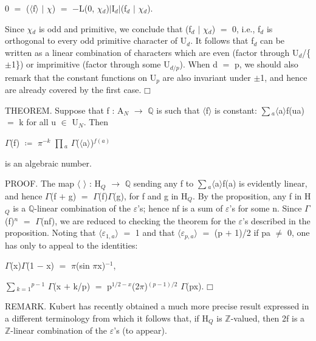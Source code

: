 \documentclass[10pt,twoside]{article}
\begin{document}
0 \ensuremath{=} (\ensuremath{⟨}f\ensuremath{⟩} \ensuremath{|} \ensuremath{χ}) \ensuremath{=} \ensuremath{−}L(0, \ensuremath{χ}\ensuremath{_{d}})\ensuremath{|}I\ensuremath{_{d}}\ensuremath{|}(f\ensuremath{_{d}} \ensuremath{|} \ensuremath{χ}\ensuremath{_{d}}).\par
Since \ensuremath{χ}\ensuremath{_{d}} is odd and primitive, we conclude that (f\ensuremath{_{d}} \ensuremath{|} \ensuremath{χ}\ensuremath{_{d}}) \ensuremath{=} 0, i.e., f\ensuremath{_{d}} is orthogonal to every odd primitive character of U\ensuremath{_{d}}. It follows that f\ensuremath{_{d}} can be written as a linear combination of characters which are even (factor through U\ensuremath{_{d}}/\{\ensuremath{±}1\}) or imprimitive (factor through some U\ensuremath{_{d/p}}). When d \ensuremath{=} p, we should also remark that the constant functions on U\ensuremath{_{p}} are also invariant under \ensuremath{±}1, and hence are already covered by the first case. \ensuremath{□}\par
THEOREM. Suppose that f : A\ensuremath{_{N}} \ensuremath{→} \ensuremath{ℚ} is such that \ensuremath{⟨}f\ensuremath{⟩} is constant: \ensuremath{∑}\ensuremath{_{a}}\ensuremath{⟨}a\ensuremath{⟩}f(ua) \ensuremath{=} k for all u \ensuremath{∈} U\ensuremath{_{N}}. Then\par
\ensuremath{Γ}(f) \ensuremath{≔} \ensuremath{π}\ensuremath{^{-k}} \ensuremath{∏}\ensuremath{_{a}} \ensuremath{Γ}(\ensuremath{⟨}a\ensuremath{⟩})\ensuremath{^{f(a)}}\par
is an algebraic number.\par
PROOF. The map \ensuremath{⟨} \ensuremath{⟩} : H\ensuremath{_{Q}} \ensuremath{→} \ensuremath{ℚ} sending any f to \ensuremath{∑}\ensuremath{_{a}}\ensuremath{⟨}a\ensuremath{⟩}f(a) is evidently linear, and hence \ensuremath{Γ}(f \ensuremath{+} g) \ensuremath{=} \ensuremath{Γ}(f)\ensuremath{Γ}(g), for f and g in H\ensuremath{_{Q}}. By the proposition, any f in H\ensuremath{_{Q}} is a \ensuremath{ℚ}-linear combination of the \ensuremath{ε}’s; hence nf is a sum of \ensuremath{ε}’s for some n. Since \ensuremath{Γ}(f)\ensuremath{^{n}} \ensuremath{=} \ensuremath{Γ}(nf), we are reduced to checking the theorem for the \ensuremath{ε}’s described in the proposition. Noting that \ensuremath{⟨}\ensuremath{ε}\ensuremath{_{1,a}}\ensuremath{⟩} \ensuremath{=} 1 and that \ensuremath{⟨}\ensuremath{ε}\ensuremath{_{p,a}}\ensuremath{⟩} \ensuremath{=} (p \ensuremath{+} 1)/2 if pa \ensuremath{≠} 0, one has only to appeal to the identities:\par
\ensuremath{Γ}(x)\ensuremath{Γ}(1 \ensuremath{−} x) \ensuremath{=} \ensuremath{π}(sin \ensuremath{π}x)\ensuremath{^{-1}},\par
\ensuremath{∑}\ensuremath{_{k=1}}\ensuremath{^{p−1}} \ensuremath{Γ}(x \ensuremath{+} k/p) \ensuremath{=} p\ensuremath{^{1/2−x}}(2\ensuremath{π})\ensuremath{^{(p−1)/2}} \ensuremath{Γ}(px). \ensuremath{□}\par
REMARK. Kubert has recently obtained a much more precise result expressed in a different terminology from which it follows that, if H\ensuremath{_{Q}} is \ensuremath{ℤ}-valued, then 2f is a \ensuremath{ℤ}-linear combination of the \ensuremath{ε}’s (to appear).\par
\end{document}
